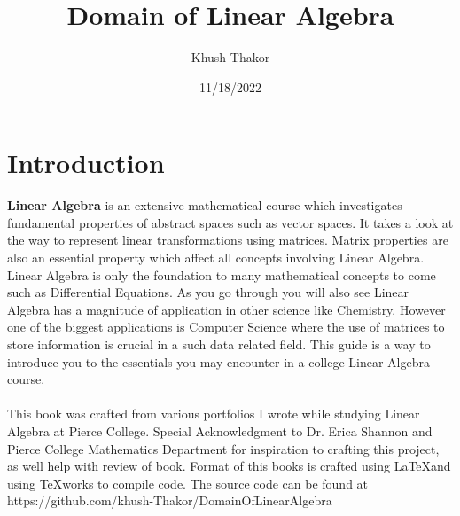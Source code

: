 \documentclass[12pt]{article}
\begin{document}
\title{Domain of Linear Algebra}
\author{Khush Thakor}
\date{11/18/2022}
\makeatletter
\renewcommand*\env@matrix[1][*\c@MaxMatrixCols c]{%
  \hskip -\arraycolsep
  \let\@ifnextchar\new@ifnextchar
  \array{#1}}
  \renewcommand*\contentsname{Table of Contents}
\makeatother
\maketitle
\begin{center}
\end{center}
\newpage
\tableofcontents
\section*{Introduction}
\textbf{Linear Algebra} is an extensive mathematical course which investigates fundamental properties of abstract spaces such as vector spaces. It takes a look at the way to represent linear transformations using matrices. Matrix properties are also an essential property which affect all concepts involving Linear Algebra. Linear Algebra is only the foundation to many mathematical concepts to come such as Differential Equations. As you go through you will also see Linear Algebra has a magnitude of application in other science like Chemistry. However one of the biggest applications is Computer Science where the use of matrices to store information is crucial in a such data related field. This guide is a way to introduce you to the essentials you may encounter in a college Linear Algebra course.
\\\\
This book was crafted from various portfolios I wrote while studying Linear Algebra at Pierce College. Special Acknowledgment to Dr. Erica Shannon and Pierce College Mathematics Department for inspiration to crafting this project, as well help with review of book. Format of this books is crafted using \LaTeX and using TeXworks to compile code. The source code can be found at https://github.com/khush-Thakor/DomainOfLinearAlgebra
\newpage
\end{document}
